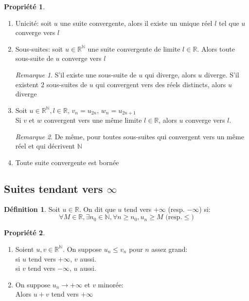 \documentclass[fleqn]{article}
\theoremstyle{definition} \newtheorem*{defi}{D\'efinition}
\theoremstyle{definition} \newtheorem*{theo}{Th\'eor\`eme}
\theoremstyle{definition} \newtheorem*{prop}{Propri\'et\'e}
\theoremstyle{definition} \newtheorem*{coro}{Corollaire}
\theoremstyle{remark} \newtheorem*{rqs}{Remarque}
\begin{document}
\begin{prop} $ $
	\begin{enumerate}
		\item Unicit\'e: soit $u$ une suite convergente, alors il existe un unique r\'eel $l$ tel que $u$ converge vers $l$
		\item Sous-suites: soit $u \in \mathbb{R}^\mathbb{N}$ une suite convergente de limite $l \in \mathbb{R}$. Alors toute sous-suite
			de $u$ converge vers $l$
			\begin{rqs}
				S'il existe une sous-suite de $u$ qui diverge, alors $u$ diverge. S'il existent 2 sous-suites de $u$ qui convergent vers des
				r\'eels distincts, alors $u$ diverge
			\end{rqs}
		\item Soit $u \in \mathbb{R}^\mathbb{N}, l \in \mathbb{R}$, $v_n = u_{2n}$, $w_n = u_{2n+1}$ \\
			Si $v$ et $w$ convergent vers une m\^eme limite $l \in \mathbb{R}$, alors $u$ converge vers $l$.
			\begin{rqs}
				De m\^eme, pour toutes sous-suites qui convergent vers un m\^eme r\'eel et qui d\'ecrivent $\mathbb{N}$
			\end{rqs}
		\item Toute suite convergente  est born\'ee
	\end{enumerate}
\end{prop}

\subsection{Suites tendant vers $\infty$}
\begin{defi}
	Soit $u \in \mathbb{R}$. On dit que $u$ tend vers $+\infty$ (resp. $-\infty$) si:
	\[\forall M \in \mathbb{R}, \exists n_0 \in \mathbb{N}, \forall n \geq n_0, u_n \geq M \text{ (resp.} \leq)\]
\end{defi}
\begin{prop} $ $
	\begin{enumerate}
		\item Soient $u, v \in \mathbb{R}^\mathbb{N}$. On suppose $u_n \leq v_n$ pour $n$ assez grand: \\
			si $u$ tend vers $+\infty$, $v$ aussi. \\
			si $v$ tend vers $-\infty$, $u$ aussi.
		\item On suppose $u_n \rightarrow +\infty$ et $v$ minor\'ee: \\
			Alors $u+v$ tend vers $+\infty$
	\end{enumerate}
\end{prop}
\end{document}
